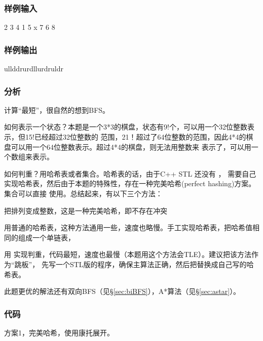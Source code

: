 \subsubsection{样例输入}
\begin{Code}
2  3  4  1  5  x  7  6  8
\end{Code}

\subsubsection{样例输出}
\begin{Code}
ullddrurdllurdruldr
\end{Code}

\subsubsection{分析}
计算“最短”，很自然的想到BFS。

如何表示一个状态？本题是一个3*3的棋盘，状态有9!个，可以用一个32位整数表示，但15!已经超过32位整数的
范围，21！超过了64位整数的范围，因此4*4的棋盘可以用一个64位整数表示。超过4*4的棋盘，则无法用整数来
表示了，可以用一个数组来表示。

如何判重？用哈希表或者集合。哈希表的话，由于C++ STL 还没有 ，
需要自己实现哈希表，然后由于本题的特殊性，存在一种完美哈希(perfect hashing)方案。集合可以直接
使用。总结起来，有以下三个方法：
\begindot
\item 把排列变成整数，这是一种完美哈希，即不存在冲突
\item 用普通的哈希表，这种方法通用一些，速度也略慢。手工实现哈希表，把哈希值相同的组成一个单链表，
\item 用  实现判重，代码最短，速度也最慢（本题用这个方法会TLE）。建议把该方法作为“跳板”，
先写一个STL版的程序，确保主算法正确，然后把替换成自己写的哈希表。
\myenddot

此题更优的解法还有双向BFS（见\S \ref{sec:biBFS}），A*算法（见\S \ref{sec:astar}）。

\subsubsection{代码}

方案1，完美哈希，使用康托展开。


